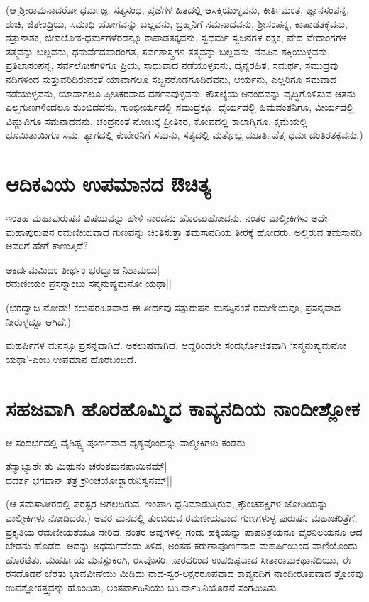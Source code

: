 (ಆ ಶ್ರೀರಾಮನಾದರೋ ಧರ್ಮಜ್ಞ, ಸತ್ಯಸಂಧ, ಪ್ರಜೆಗಳ ಹಿತದಲ್ಲಿ ಆಸಕ್ತಿಯುಳ್ಳವನು, ಕೀರ್ತಿಮಂತ, ಜ್ಞಾನಸಂಪನ್ನ, ಶುಚಿ, ಜಿತೇಂದ್ರಿಯ, ಸಮಾಧಿ ಯೋಗವನ್ನು ಬಲ್ಲವನು, ಬ್ರಹ್ಮನಿಗೆ ಸಮನಾದವನು, ಶ್ರೀಸಂಪನ್ನ, ಕಾಪಾಡತಕ್ಕವನು, ಶತ್ರುನಾಶಕ, ಜೀವಲೋಕ-ಧರ್ಮಗಳೆರಡನ್ನೂ ಕಾಪಾಡತಕ್ಕವನು, ಸ್ವಧರ್ಮ ಸ್ವಜನಗಳ ರಕ್ಷಕ, ವೇದ ವೇದಾಂಗಗಳ ತತ್ತ್ವವನ್ನು ಬಲ್ಲವನು, ಧನುರ್ವೆದಪಾರಂಗತ, ಸರ್ವಶಾಸ್ತ್ರಗಳ ತತ್ತ್ವವನ್ನು ಬಲ್ಲವನು, ನೆನಪಿನ ಶಕ್ತಿಯುಳ್ಳವನು, ಪ್ರತಿಭಾಸಂಪನ್ನ, ಸರ್ವಲೋಕಗಳಿಗೂ ಪ್ರಿಯ, ಸಾಧುವಾದ ನಡೆಯುಳ್ಳವನು, ದೈನ್ಯರಹಿತ, ಸಮರ್ಥ, ಸಮುದ್ರವು ನದಿಗಳಿಂದ ಸುತ್ತುವರಿದಿರುವಂತೆ ಯಾವಾಗಲೂ ಸಜ್ಜನರೊಡಗೂಡಿದವನು, ಆರ್ಯನು, ಎಲ್ಲರಿಗೂ ಸಮವಾದ ನಡೆಯುಳ್ಳವನು, ಯಾವಾಗಲೂ ಪ್ರೀತಿಕರವಾದ ದರ್ಶನವುಳ್ಳವನು, ಕೌಸಲ್ಯೆಯ ಆನಂದವನ್ನು ವೃದ್ಧಿಗೊಳಿಸುವ ಆತನು ಎಲ್ಲಗುಣಗಳಿಂದಲೂ ತುಂಬಿದವನು, ಗಾಂಭೀರ್ಯದಲ್ಲಿ ಸಮುದ್ರಕ್ಕೂ, ಧೈರ್ಯದಲ್ಲಿ ಹಿಮವಂತನಿಗೂ, ವೀರ್ಯದಲ್ಲಿ ವಿಷ್ಣುವಿಗೂ ಸಮನಾದವನು, ಚಂದ್ರನಂತೆ ನೋಟಕ್ಕೆ ಪ್ರೀತಿಕರ, ಕೋಪದಲ್ಲಿ ಕಾಲಾಗ್ನಿಗೂ, ಕ್ಷಮೆಯಲ್ಲಿ ಭೂಮಿತಾಯಿಗೂ ಸಮ, ತ್ಯಾಗದಲ್ಲಿ ಕುಬೇರನಿಗೆ ಸಮನು, ಸತ್ಯದಲ್ಲಿ ಮತ್ತೊಬ್ಬ ಮೂರ್ತಿವೆತ್ತ ಧರ್ಮದಂತಿರತಕ್ಕವನು.) 

\section*{ಆದಿಕವಿಯ ಉಪಮಾನದ ಔಚಿತ್ಯ} 

ಇಂತಹ ಮಹಾಪುರುಷನ ವಿಷಯವನ್ನು ಹೇಳಿ ನಾರದನು ಹೊರಟುಹೋದನು. ನಂತರ ವಾಲ್ಮೀಕಿಗಳು ಅದೇ ಮಹಾಪುರುಷನ ರಮಣೀಯವಾದ ಗುಣವನ್ನು ಚಿಂತಿಸುತ್ತಾ ತಮಸಾನದಿಯ ತೀರಕ್ಕೆ ಹೋದರು. ಅಲ್ಲಿರುವ ತಮಸಾನದಿ ಅವರಿಗೆ ಹೇಗೆ ಕಾಣುತ್ತಿದೆ?- 

\begin{shloka} 
ಅಕರ್ದಮಮಿದಂ ತೀರ್ಥಂ ಭರದ್ವಾಜ ನಿಶಾಮಯ|\label{156}\\ 
ರಮಣೀಯಂ ಪ್ರಸನ್ನಾಂಬು ಸನ್ಮನುಷ್ಯಮನೋ ಯಥಾ||
\end{shloka} 

(ಭರದ್ವಾಜ ನೋಡು! ಕಲುಷರಹಿತವಾದ ಈ ತೀರ್ಥವು ಸತ್ಪುರುಷನ ಮನಸ್ಸಿನಂತೆ ರಮಣೀಯವೂ, ಪ್ರಸನ್ನವಾದ ನೀರುಳ್ಳದ್ದೂ ಆಗಿದೆ.) 

ಮಹರ್ಷಿಗಳ ಮನಸ್ಸೂ ಪ್ರಸನ್ನವಾಗಿದೆ. ಅಕಲುಷವಾಗಿದೆ. ಆದ್ದರಿಂದಲೇ ಸಂದರ್ಭೊಚಿತವಾಗಿ `ಸನ್ಮನುಷ್ಯಮನೋ ಯಥಾ'-ಎಂಬ ಉಪಮಾನ ಹೊರಬಂದಿದೆ. 

\section*{ಸಹಜವಾಗಿ ಹೊರಹೊಮ್ಮಿದ ಕಾವ್ಯನದಿಯ ನಾಂದೀಶ್ಲೋಕ} 

ಆ ಸಂದರ್ಭದಲ್ಲಿ ವೈಶಿಷ್ಟ್ಯ ಪೂರ್ಣವಾದ ದೃಶ್ಯವೊಂದನ್ನು ವಾಲ್ಮೀಕಿಗಳು ಕಂಡರು- 

\begin{shloka} 
ತಸ್ಯಾಭ್ಯಾಶೇ ತು ಮಿಥುನಂ ಚರಂತಮನಪಾಯಿನಮ್‍|\\ 
ದದರ್ಶ ಭಗವಾನ್ ತತ್ರ ಕ್ರೌಂಚಯೋಶ್ಚಾರುನಿಸ್ವನಮ್‍||
\end{shloka} 

(ಆ ತಮಸಾತೀರದಲ್ಲಿ ಪರಸ್ಪರ ಅಗಲದಿರುವ, ಇಂಪಾಗಿ ಧ್ವನಿಮಾಡುತ್ತಿರುವ, ಕ್ರೌಂಚಪಕ್ಷಿಗಳ ಜೋಡಿಯನ್ನು ವಾಲ್ಮೀಕಿಗಳು ನೋಡಿದರು.) ಅವರ ಮನದಲ್ಲಿ ತುಂಬಿರುವ ರಮಣೀಯವಾದ ಗುಣಗಳುಳ್ಳ ಪುರುಷನ ಮಹಾಚರಿತ್ರೆಗೆ, ಪ್ರಕೃತಿಯ ರಮಣೀಯತೆಯೂ ಸೇರಿದೆ. ನಂತರ ಅವುಗಳಲ್ಲಿ ಗಂಡು ಹಕ್ಕಿಯನ್ನು ಪಾಪನಿಶ್ಚಯನೂ ವೈರನಿಲಯನೂ ಆದ ಬೇಡನು ಹೊಡೆದ. ಅದನ್ನು ಅಧರ್ಮವೆಂದು ತಿಳಿದ, ಅಂತಹ ಕರುಣಾಪೂರ್ಣನಾದ ಮಹರ್ಷಿಯಿಂದ ವಾಣಿಯೊಂದು ಹೊರಟಿತು. ಮಹರ್ಷಿಯ ಮನಸ್ಸುಕರಗಿ, ರಸವೊಸರಿ, ನಾರದರಿಂದ ಉಪದಿಷ್ಟವಾದ ಸೀತಾರಾಮಕಥಾನದಿಯು, ಈ ರಸದೊಡನೆ ಬೆರೆತು ಭಾವವೀಣೆಯು ಮಿಡಿದು ನಾದ-ಸ್ವರ-ಅಕ್ಷರರೂಪವಾದ ಕಾವ್ಯನದಿಗೆ ನಾಂದೀರೂಪವಾದ ಶ್ಲೋಕವು ಉಪಶ್ಲೋಕತ್ತ್ವವನ್ನು ಹೊಂದಿತು, ಅಂತರ್ವಾಹಿನಿಯು ಬಹಿರ್ವಾಹಿನಿಯೊಡನೆ ಸಂಗಮಿಸಿತು. 

